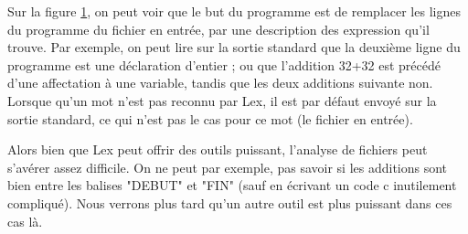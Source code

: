 Sur la figure \href{fig:lex}{1},  on peut voir que le but du programme est de remplacer les lignes du programme du fichier en entrée, par une description des expression qu'il trouve. Par exemple, on peut lire sur la sortie standard que la deuxième ligne du programme est une déclaration d'entier ; ou que l'addition 32+32 est précédé d'une affectation à une variable, tandis que les deux additions suivante non.
Lorsque qu'un mot n'est pas reconnu par Lex, il est par défaut envoyé sur la sortie standard, ce qui n'est pas le cas pour ce mot (le fichier en entrée).

Alors bien que Lex peut offrir des outils puissant, l'analyse de fichiers peut s'avérer assez difficile. On ne peut par exemple, pas savoir si les additions sont bien entre les balises "DEBUT" et "FIN" (sauf en écrivant un code c inutilement compliqué). Nous verrons plus tard qu'un autre outil est plus puissant dans ces cas là.